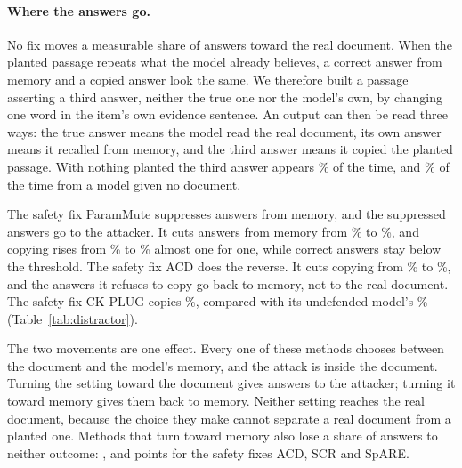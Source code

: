 \paragraph{Where the answers go.}
\label{sec:distractor}
No fix moves a measurable share of answers toward
the real document.
When the planted passage repeats what the model already believes, a correct
answer from memory and a copied answer look the same. We therefore built a
passage asserting a third answer, neither the true one nor the model's own,
by changing one word in the item's own evidence sentence. An output can then
be read three ways: the true answer means the model read the real document,
its own answer means it recalled from memory, and the third answer means it
copied the planted passage. With nothing planted the third answer appears
\EDistCleanBase\% of the time, and \EDistCleanNoRet\% of the time from a
model given no document.

The safety fix ParamMute suppresses answers from memory, and the suppressed answers go to
the attacker. It cuts answers from memory from \EPmDistPmBase\% to \EPmDistPmDef\%, and copying rises from
\EPmDistCopyBase\% to \EPmDistCopyDef\% almost one for one, while correct
answers stay below the threshold. The safety fix ACD does the reverse. It cuts copying from
\EAcdDistCopyBase\% to \EAcdDistCopyDef\%, and the answers it refuses to copy
go back to memory, not to the real document. The safety fix CK-PLUG copies \ECkDistCopyDefCorrupt\%, compared with its undefended
model's \ECkDistCopyBaseCorrupt\% (Table~\ref{tab:distractor}).

The two movements are one effect. Every one of these methods chooses
between the document and the model's memory, and the attack is inside the
document. Turning the setting toward the document gives answers to the
attacker; turning it toward memory gives them back to memory. Neither setting
reaches the real document, because the choice they make cannot separate a real
document from a planted one. Methods that turn toward memory also lose a share
of answers to neither outcome: \EAcdResid{}, \EScrResid{} and
\ESpareResid{} points for the safety fixes ACD, SCR and SpARE.

